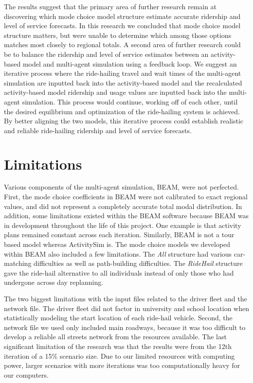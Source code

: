 \documentclass[simple, masters, twoside]{byuthesis}
\begin{document}
The results suggest that the primary area of further research remain at discovering which mode choice model structure estimate accurate ridership and level of service forecasts. In this research we concluded that mode choice model structure matters, but were unable to determine which among those options matches most closely to regional totals. A second area of further research could be to balance the ridership and level of service estimates between an activity-based model and multi-agent simulation using a feedback loop. We suggest an iterative process where the ride-hailing travel and wait times of the multi-agent simulation are inputted back into the activity-based model and the recalculated activity-based model ridership and usage values are inputted back into the multi-agent simulation. This process would continue, working off of each other, until the desired equilibrium and optimization of the ride-hailing system is achieved. By better aligning the two models, this iterative process could establish realistic and reliable ride-hailing ridership and level of service forecasts.

\hypertarget{limitations}{%
\section{Limitations}\label{limitations}}

Various components of the multi-agent simulation, BEAM, were not perfected. First, the mode choice coefficients in BEAM were not calibrated to exact regional values, and did not represent a completely accurate total modal distribution. In addition, some limitations existed within the BEAM software because BEAM was in development throughout the life of this project. One example is that activity plans remained constant across each iteration. Similarly, BEAM is not a tour based model whereas ActivitySim is. The mode choice models we developed within BEAM also included a few limitations. The \emph{All} structure had various car-matching difficulties as well as path-building difficulties. The \emph{RideHail} structure gave the ride-hail alternative to all individuals instead of only those who had undergone across day replanning.

The two biggest limitations with the input files related to the driver fleet and the network file. The driver fleet did not factor in university and school location when statistically modeling the start location of each ride-hail vehicle. Second, the network file we used only included main roadways, because it was too difficult to develop a reliable all streets network from the resources available. The last significant limitation of the research was that the results were from the 12th iteration of a 15\% scenario size. Due to our limited resources with computing power, larger scenarios with more iterations was too computationally heavy for our computers.
\end{document}
